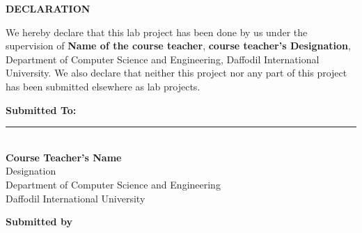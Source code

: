 
\vspace*{1.5cm} 


\begin{center}
    {\LARGE \textbf{DECLARATION}}\\
\end{center}

\onehalfspacing

\noindent We hereby declare that this lab project has been done by us under the supervision of \textbf{Name of the course teacher}, \textbf{course teacher's Designation}, Department of Computer Science and Engineering, Daffodil International University. We also declare that neither this project nor any part of this project has been submitted elsewhere as lab projects. 

\vspace{.8cm}

\noindent \textbf{Submitted To:} \\[1cm]

\noindent\rule{6cm}{0.4pt}\\
\textbf{Course Teacher's Name} \\
Designation \\
Department of Computer Science and Engineering \\
Daffodil International University \\

\vspace{.5cm}

\begin{center}
    \textbf{Submitted by}
\end{center}

\vspace{.2cm}

